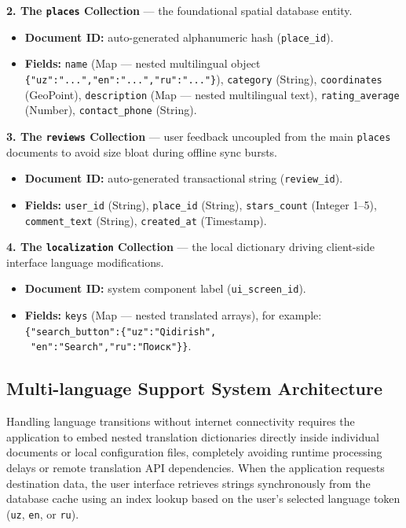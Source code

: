 \documentclass[12pt,a4paper,oneside]{report}
\begin{document}
\textbf{2. The \texttt{places} Collection} --- the foundational spatial database entity.
\begin{itemize}[leftmargin=1.4em]
  \item \textbf{Document ID:} auto-generated alphanumeric hash (\texttt{place\_id}).
  \item \textbf{Fields:} \texttt{name} (Map --- nested multilingual object
        \texttt{\{"uz":"...","en":"...","ru":"..."\}}), \texttt{category} (String),
        \texttt{coordinates} (GeoPoint), \texttt{description} (Map --- nested multilingual
        text), \texttt{rating\_average} (Number), \texttt{contact\_phone} (String).
\end{itemize}

\textbf{3. The \texttt{reviews} Collection} --- user feedback uncoupled from the main
\texttt{places} documents to avoid size bloat during offline sync bursts.
\begin{itemize}[leftmargin=1.4em]
  \item \textbf{Document ID:} auto-generated transactional string (\texttt{review\_id}).
  \item \textbf{Fields:} \texttt{user\_id} (String), \texttt{place\_id} (String),
        \texttt{stars\_count} (Integer 1--5), \texttt{comment\_text} (String),
        \texttt{created\_at} (Timestamp).
\end{itemize}

\textbf{4. The \texttt{localization} Collection} --- the local dictionary driving
client-side interface language modifications.
\begin{itemize}[leftmargin=1.4em]
  \item \textbf{Document ID:} system component label (\texttt{ui\_screen\_id}).
  \item \textbf{Fields:} \texttt{keys} (Map --- nested translated arrays), for example:\\
        \texttt{\{"search\_button":\{"uz":"Qidirish",}\\
        \texttt{\ "en":"Search","ru":"Поиск"\}\}}.
\end{itemize}

\subsection{Multi-language Support System Architecture}

Handling language transitions without internet connectivity requires the application to
embed nested translation dictionaries directly inside individual documents or local
configuration files, completely avoiding runtime processing delays or remote translation
API dependencies. When the application requests destination data, the user interface
retrieves strings synchronously from the database cache using an index lookup based on the
user's selected language token (\texttt{uz}, \texttt{en}, or \texttt{ru}).
\end{document}
